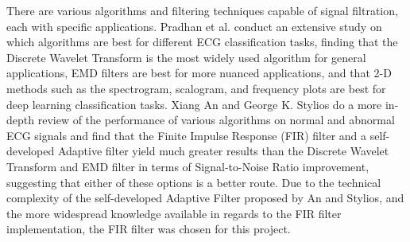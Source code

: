 \documentclass{article}
\begin{document}
There are various algorithms and filtering techniques capable of signal filtration, each with specific applications. Pradhan et al. \cite{timefreqmethods} conduct an extensive study on which algorithms are best for different ECG classification tasks, finding that the Discrete Wavelet Transform is the most widely used algorithm for general applications, EMD filters are best for more nuanced applications, and that 2-D methods such as the spectrogram, scalogram, and frequency plots are best for deep learning classification tasks. Xiang An and George K. Stylios \cite{filtercomparison} do a more in-depth review of the performance of various algorithms on normal and abnormal ECG signals and find that the Finite Impulse Response (FIR) filter and a self-developed Adaptive filter yield much greater results than the Discrete Wavelet Transform and EMD filter in terms of Signal-to-Noise Ratio improvement, suggesting that either of these options is a better route. Due to the technical complexity of the self-developed Adaptive Filter proposed by An and Stylios, and the more widespread knowledge available in regards to the FIR filter implementation, the FIR filter was chosen for this project.
\par
\newpage
\end{document}
